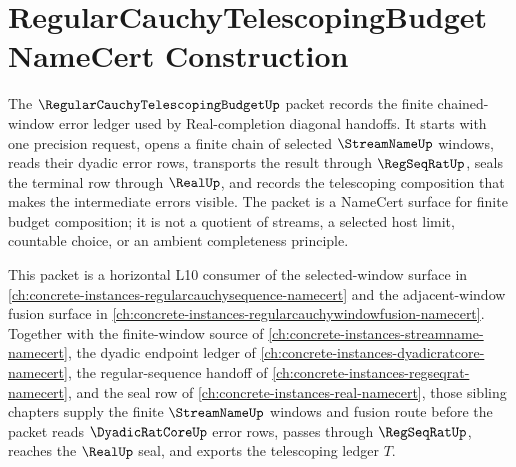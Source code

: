\chapter{RegularCauchyTelescopingBudget NameCert Construction}
\label{ch:concrete-instances-regular-cauchy-telescoping-budget-namecert}

The $\RegularCauchyTelescopingBudgetUp$ packet records the finite chained-window error ledger used by Real-completion diagonal handoffs. It starts with one precision request, opens a finite chain of selected $\StreamNameUp$ windows, reads their dyadic error rows, transports the result through $\RegSeqRatUp$, seals the terminal row through $\RealUp$, and records the telescoping composition that makes the intermediate errors visible. The packet is a NameCert surface for finite budget composition; it is not a quotient of streams, a selected host limit, countable choice, or an ambient completeness principle.

This packet is a horizontal L10 consumer of the selected-window surface in \autoref{ch:concrete-instances-regularcauchysequence-namecert} and the adjacent-window fusion surface in \autoref{ch:concrete-instances-regularcauchywindowfusion-namecert}. Together with the finite-window source of \autoref{ch:concrete-instances-streamname-namecert}, the dyadic endpoint ledger of \autoref{ch:concrete-instances-dyadicratcore-namecert}, the regular-sequence handoff of \autoref{ch:concrete-instances-regseqrat-namecert}, and the seal row of \autoref{ch:concrete-instances-real-namecert}, those sibling chapters supply the finite $\StreamNameUp$ windows and fusion route before the packet reads $\DyadicRatCoreUp$ error rows, passes through $\RegSeqRatUp$, reaches the $\RealUp$ seal, and exports the telescoping ledger $T$.

